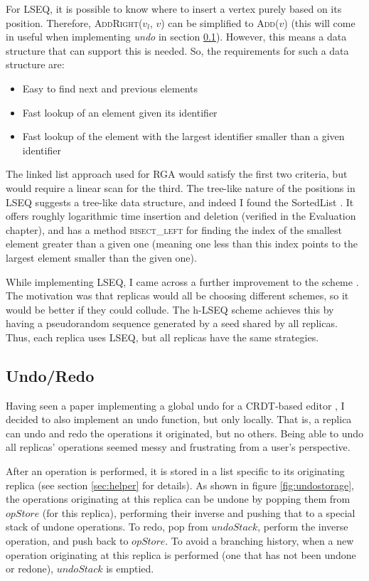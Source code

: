 \documentclass[diss.tex]{subfiles}
\begin{document}
For LSEQ, it is possible to know where to insert a vertex purely based on its position. Therefore, \textsc{AddRight($v_l$, $v$)} can be simplified to \textsc{Add($v$)} (this will come in useful when implementing \textit{undo} in section \ref{sec:undo}). However, this means a data structure that can support this is needed. So, the requirements for such a data structure are:
\begin{itemize}
\item Easy to find next and previous elements
\item Fast lookup of an element given its identifier
\item Fast lookup of the element with the largest identifier smaller than a given identifier
\end{itemize}
The linked list approach used for RGA would satisfy the first two criteria, but would require a linear scan for the third. The tree-like nature of the positions in LSEQ suggests a tree-like data structure, and indeed I found the SortedList \cite{sortedlist}. It offers roughly logarithmic time insertion and deletion (verified in the Evaluation chapter), and has a method \textsc{bisect\_left} for finding the index of the smallest element greater than a given one (meaning one less than this index points to the largest element smaller than the given one).

While implementing LSEQ, I came across a further improvement to the scheme \cite{hlseq}. The motivation was that replicas would all be choosing different schemes, so it would be better if they could collude. The h-LSEQ scheme achieves this by having a pseudorandom sequence generated by a seed shared by all replicas. Thus, each replica uses LSEQ, but all replicas have the same strategies.


\subsection{Undo/Redo}\label{sec:undo}
Having seen a paper implementing a global undo for a CRDT-based editor \cite{logootundo}, I decided to also implement an undo function, but only locally. That is, a replica can undo and redo the operations it originated, but no others. Being able to undo all replicas' operations seemed messy and frustrating from a user's perspective.

After an operation is performed, it is stored in a list specific to its originating replica (see section \ref{sec:helper} for details). As shown in figure \ref{fig:undostorage}, the operations originating at this replica can be undone by popping them from $opStore$ (for this replica), performing their inverse and pushing that to a special stack of undone operations. To redo, pop from $undoStack$, perform the inverse operation, and push back to $opStore$. To avoid a branching history, when a new operation originating at this replica is performed (one that has not been undone or redone), $undoStack$ is emptied.
\end{document}

